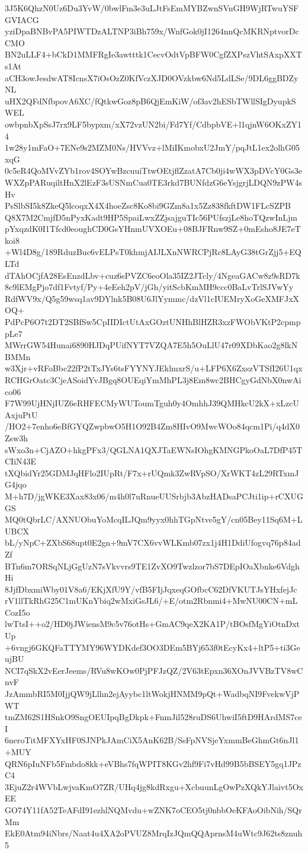 3J5K6QhzN0Uz6Du3YvW/0bwlFm3e3uLJtFsEmMYBZwnSVnGH9WjRTwuYSFGVIACG
yziDpaBNBvPA5PIWTDzALTNP3iBh759x/WnfGok0jI1264nnQcMKRNptvorDcCMO
BN2uLLF4+bCkD1MMFRgIe3awtttk1CecvOdtVpBFW0CgfZXPszVhtSAxpXXTs1At
aCH3owJesdwAT8IcnsX7iOsOzZ0KfVczXJD0OVzkbw6Nd5LdLSe/9DL6ggBDZyNL
uHX2QFdNfbpovA6XC/fQtkwGoz8pB6QjEmKiW/of3av2hESbTWllSIgDyupkSWEL
owbpnbXpSsJ7rx9LF5bypxm/xX72vzUN2bi/Fd7Yf/CdbpbVE+l1qjnW6OKxZY14
1w28y1mFaO+7ENe9s2MZM0Ns/HVVvz+lMiIKmobxU2JmY/pqJtL1ex2olhG05xqG
0c5eR4QoMVvZYb1rov4SOYwBzcuuiTtwOEtjflZzatA7Cb0ji4wWX3pDVcY0Gs3e
WXZpPARuqiltHnX2lEzF3sUSNmCua0TE3rkd7BUNfdzG6eYsjgrjLDQN9zPW4sHv
PsSlbSI5k8ZkeQ5lcoqxX4X4hoeZsc8Ko8bi9GZm8a1x5Zz838fkftDW1FLcSZPB
Q8X7M2CmjfD5nPyxKadt9HP5SpaiLwxZZjsajguTIc56PUfszjLe8hoTQzwInLjm
pYxqzdK0I1Tfcd0eoughCD0GsYHnmUVXOEu+08BJFRnw9SZ+0mEsho8JE7eTkoi8
+Wl4D8g/189RduzBuc6vELPsT0khmjAIJLXnNWRCPjRc8LAyG38tGrZjj5+EQLTd
dTAhOCjfA28EsEnzdLbv+cuz6sPVZC6eoOla35IZ2JTcly/4NgeaGACw8z9sRD7k
8c9lEMgPjo7df1Fvtyf/Py+4eEeh2pV/jGh/yitScbKmMH9ccc0BaLvTrlSJVwYy
RdfWV9x/Q5g59wsq1av9DYlnk5B08U6JlYymmc/dzVl1cIUEMryXoGeXMFJxXOQ+
PdPcP6O7t2DT2SBfSw5CpIIDIctUtAxGOztUNHhBlHZR3xzFWObVKtP2cpmppLe7
MWrrGW54Hunai6890HJDqPUifNYT7VZQA7E5h5OuLlU47r09XDbKao2g8lkNBMMn
w3Xjr+vRFoBbc22fP2tTxJYs6tsFYYNYJEklmxrS/u+LFP6X6ZxszVTSfI26U1qx
RCHGrOatc3CjeASoidYvJBgq8OUEqiYmMhPL3j8Em8wc2BHCgyGdNbX0nwAico06
F7W99UjHNjIUZ6eRHFECMyWUToumTguh0y4OmhhJ39QMHkcU2kX+xLzcUAxjuPtU
/HO2+7enho6eBfGYQZwpbwO5H1O92B4Zm8HIvO9MwcWOo84qcm1Pi/q4dX0Zsw3h
sWxo3n+CjAZO+hkgPFx3/QGLNA1QXJTaEWNsIOhgKMNGPkoOaL7DfP45TCIiN43E
tXQbidYr25GDMJqHFlo2IUpRt/F7x+rUQmk3ZwRVpSO/XrWKT4zL29RTxmJG4jqo
M+h7D/jgWKE3Xax83x06/m4h0l7uRnueUUSrbjb3AbzHADsaPCJti1ip+rCXUGGS
MQ0tQbrLC/AXNUObuYoMcqILJQm9yyx0hhTGpNtve5gY/cn05Bey11Sq6M+LUBCX
bL/yNpC+ZXbS68upt0E2gn+9mV7CX6vvWLKmb07zx1j4H1DdiUfogvq76p84adZf
BTn6m7ORSqNLjGgUzN7sVkvvrs9TE1ZvXO9Twzlzor7bS7DEpIOaXbnke6VdghHi
8JjfDbxmiWby01V8a6/EKjXfU9Y/vfB5FIjJqxeqGOfbcC62DfVKUTJsYHxfejJc
rV1llTkRhG25C1mUKnYbiq2wMxiGsJL6/+E/otm2Rbnmi4+MwNU00CN+mLCozI5o
lwTtsI++o2/HD0jJWiensM9c5v76otHs+GmAC9qeX2KA1P/tBOsfMgYiOtnDxtUp
+6vngj6GKQFaTTYMY96WYDKdef3OO3DEm5BYj653f0tEcyKx4+ltP5+ti3GeujBU
NCI7qSkX2vEerJeems/RVu8wKOw0PjPFJzQZ/2V63tEpxn36XOnJVVBzTV8wCnvF
JzAmmbRI5M0IjjQW9jLlhn2ejAyybc1ltWokjHNMM9pQt+WadbqNI9FvekwVjPWT
tmZM62S1HSnkO9SngOEUIpqBgDkpk+FnmJil528ruDS6UhwiI5ftD9HArdMS7ceI
6neroTitMFXYxHF0SJNPkJAmCiX5AnK62B/SsFpNVSjeYxmmBeGhmGt6nJl1+MUY
QRN6pIuNFb5Fmbdo8kk+eVBhs7fqWPIT8KGv2hf9Fi7vHd99B5bBSEY5gq1JPzC4
3EjuZ2r4WVbLwjvaKmO7ZR/UHq4jg8kdRxgu+XcbuunLgOwPzXQkYJlaivt5OxEE
GO74Y11fA52TeAFdI91ezhlNQMvdu+wZNK7oCEO5tj0nbbOeKFAoOibNih/SQrMm
EkE0Atm94iNbrs/Naat4u4XA2oPVUZ8MrqIzJQmQQAprnsM4uWtc9J62ts8znuh5
